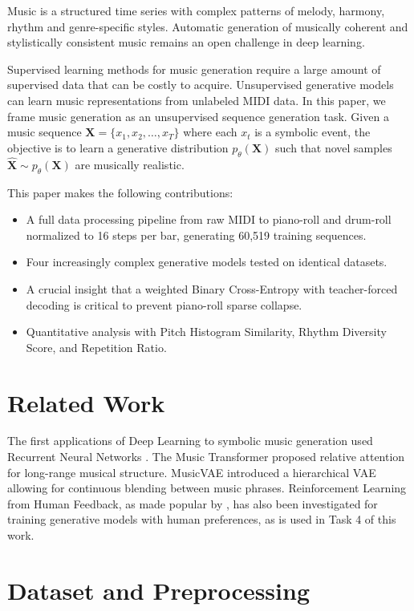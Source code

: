 \documentclass[conference]{IEEEtran}
\begin{document}
Music is a structured time series with complex patterns of melody, harmony, rhythm and genre-specific styles. Automatic generation of musically coherent and stylistically consistent music remains an open challenge in deep learning.

Supervised learning methods for music generation require a large amount of supervised data that can be costly to acquire. Unsupervised generative models can learn music representations from unlabeled MIDI data. In this paper, we frame music generation as an unsupervised sequence generation task. Given a music sequence $\mathbf{X} = \{x_1, x_2, \ldots, x_T\}$ where each $x_t$ is a symbolic event, the objective is to learn a generative distribution $p_\theta(\mathbf{X})$ such that novel samples $\hat{\mathbf{X}} \sim p_\theta(\mathbf{X})$ are musically realistic.

This paper makes the following contributions:
\begin{itemize}
    \item A full data processing pipeline from raw MIDI
    to piano-roll and drum-roll normalized
    to 16 steps per bar, generating 60,519 training sequences.
    \item Four increasingly complex generative models tested
    on identical datasets.

    \item A crucial insight that a weighted Binary Cross-Entropy
    with teacher-forced decoding is critical to prevent
    piano-roll sparse collapse.
    \item Quantitative analysis with Pitch Histogram Similarity,
    Rhythm Diversity Score, and Repetition Ratio.
\end{itemize}

\section{Related Work}

The first applications of Deep Learning to symbolic music generation used Recurrent Neural Networks \cite{b3}. The Music Transformer \cite{b4} proposed relative attention for long-range musical structure. MusicVAE \cite{b5} introduced a hierarchical VAE allowing for continuous blending between music phrases. Reinforcement Learning from Human Feedback, as made popular by \cite{b6}, has also been investigated for training generative models with human preferences, as is used in Task 4 of this work.

\section{Dataset and Preprocessing}
\end{document}

